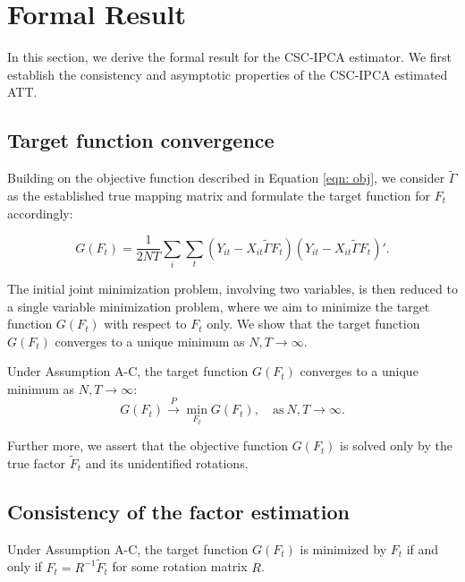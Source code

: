 \documentclass[12pt]{article}
\begin{document}
\clearpage
\section{Formal Result}
\label{sec: formal result}
In this section, we derive the formal result for the CSC-IPCA estimator. We first establish the consistency and asymptotic properties of the CSC-IPCA estimated ATT.

\subsection{Target function convergence}
Building on the objective function described in Equation \ref{eqn: obj}, we consider $\tilde{\Gamma}$ as the established true mapping matrix and formulate the target function for $F_t$ accordingly:

\begin{equation}
G(F_t) = \frac{1}{2NT} \sum_{i} \sum_{t} \left( Y_{it} - X_{it} \tilde{\Gamma} F_t \right)\left( Y_{it} - X_{it} \tilde{\Gamma} F_t \right)'.
\end{equation}

The initial joint minimization problem, involving two variables, is then reduced to a single variable minimization problem, where we aim to minimize the target function  $G(F_t)$ with respect to $F_t$ only. We show that the target function $G(F_t)$ converges to a unique minimum as $N, T \to \infty$.

\begin{proposition}
\label{prop: target}
Under Assumption A-C, the target function $G(F_t)$ converges to a unique minimum as $N, T \to \infty$:
\begin{equation}
G(F_t) \xrightarrow{P} \min_{F_t} G(F_t), \quad \text{as} \ N, T \to \infty.
\end{equation}
\end{proposition}

Further more, we assert that the objective function $G(F_t)$ is solved only by the true factor $\tilde{F}_t$ and its unidentified rotations.

\subsection{Consistency of the factor estimation}
\begin{proposition}
\label{prop: true factor}
Under Assumption A-C, the target function $G(F_t)$ is minimized by $F_t$ if and only if $F_t = R^{-1}\tilde{F}_t$ for some rotation matrix $R$.
\end{proposition}
\end{document}
